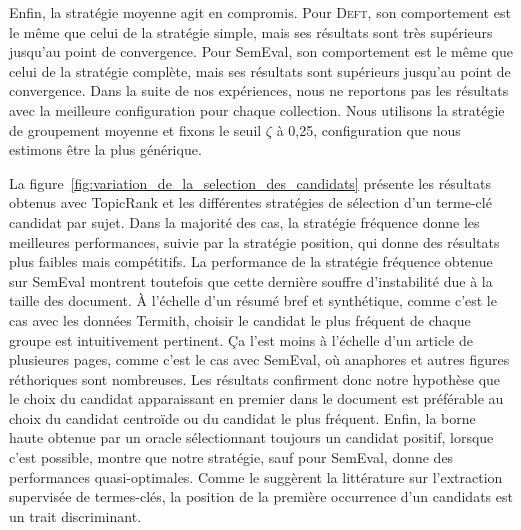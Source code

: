         Enfin, la stratégie moyenne agit en compromis. Pour \textsc{Deft}, son
        comportement est le même que celui de la stratégie simple, mais ses
        résultats sont très supérieurs jusqu'au point de convergence. Pour
        SemEval, son comportement est le même que celui de la stratégie
        complète, mais ses résultats sont supérieurs jusqu'au point de
        convergence.
        Dans la suite de nos expériences, nous ne reportons pas les résultats
        avec la meilleure configuration pour chaque collection. Nous utilisons
        la stratégie de groupement moyenne et fixons le seuil $\zeta$ à 0,25,
        configuration que nous estimons être la plus générique.

        La figure~\ref{fig:variation_de_la_selection_des_candidats} présente les
        résultats obtenus avec TopicRank et les différentes stratégies de
        sélection d'un terme-clé candidat par sujet. Dans la majorité des cas,
        la stratégie fréquence donne les meilleures performances, suivie par la
        stratégie position, qui donne des résultats plus faibles mais
        compétitifs. La performance de la stratégie fréquence obtenue sur
        SemEval montrent toutefois que cette dernière souffre d'instabilité due
        à la taille des document. À l'échelle d'un résumé bref et synthétique,
        comme c'est le cas avec les données Termith, choisir le candidat le plus
        fréquent de chaque groupe est intuitivement pertinent. Ça l'est moins à
        l'échelle d'un article de plusieures pages, comme c'est le cas avec
        SemEval, où anaphores et autres figures réthoriques sont nombreuses. Les
        résultats confirment donc notre hypothèse que le choix du candidat
        apparaissant en premier dans le document est préférable au choix du
        candidat centroïde ou du candidat le plus fréquent. Enfin, la borne
        haute obtenue par un oracle sélectionnant toujours un candidat positif,
        lorsque c'est possible, montre que notre stratégie, sauf pour SemEval,
        donne des performances quasi-optimales. Comme le suggèrent la
        littérature sur l'extraction supervisée de termes-clés, la position de
        la première occurrence d'un candidats est un trait discriminant.
